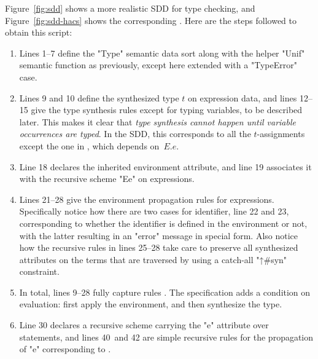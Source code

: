 \documentclass[11pt]{article} %
\begin{document}
\begin{example}
  Figure~\ref{fig:sdd} shows a more realistic SDD for type checking, and Figure~\ref{fig:sdd-hacs}
  shows the corresponding \HAX. Here are the steps followed to obtain this script:
  \begin{enumerate}

  \item Lines 1--7 define the "Type" semantic data sort along with the helper "Unif" semantic
    function as previously, except here extended with a "TypeError" case.

  \item Lines 9 and 10 define the synthesized type $t$ on expression data, and lines 12--15 give the
    type synthesis rules except for typing variables, to be described later. This makes it clear
    that \emph{type synthesis cannot happen until variable occurrences are typed}. In the SDD, this
    corresponds to all the $t$-assignments except the one in , which depends on~$E.e$.

  \item Line 18 declares the inherited environment attribute, and line 19 associates it with the
    recursive scheme "Ee" on expressions.

  \item Lines 21--28 give the environment propagation rules for expressions. Specifically notice how
    there are two cases for identifier, line 22 and 23, corresponding to whether the identifier is
    defined in the environment or not, with the latter resulting in an "error" message in special
    \HAX form. Also notice how the recursive rules in lines 25--28 take care to preserve all
    synthesized attributes on the terms that are traversed by using a catch-all "↑#syn" constraint.

  \item In total, lines 9--28 fully capture rules . The \HAX specification adds a
    condition on evaluation: first apply the environment, and then synthesize the type.

  \item Line 30 declares a recursive scheme carrying the "e" attribute over statements, and lines
    40~and 42 are simple recursive rules for the propagation of "e" corresponding to
    .


\end{enumerate}
\end{example}
\end{document}
